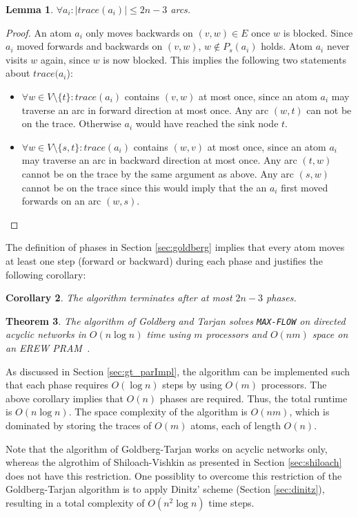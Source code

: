 \documentclass[a4paper,10pt, twocolumn]{article}
\newtheorem{lemma}{Lemma}
\newtheorem{corollary}[lemma]{Corollary}
\newtheorem{theorem}[lemma]{Theorem}
\begin{document}
\begin{lemma}
$\forall a_i:\lvert trace(a_i) \rvert \leq 2n-3$ arcs.
\end{lemma}
\begin{proof}
An atom $a_i$ only moves backwards on $(v,w) \in E$ once $w$ is blocked. Since $a_i$ moved forwards and backwards on $(v,w)$, $w \notin P_s(a_i)$ holds. Atom $a_i$ never visits $w$ again, since $w$ is now blocked. This implies the following two statements about $trace(a_i$):
\begin{itemize}
	\item $\forall w \in V \setminus \{t\}: trace(a_i)$ contains $(v,w)$ at most once, since an atom $a_i$ may traverse an arc in forward direction at most once. Any arc $(w,t)$ can not be on the trace. Otherwise $a_i$ would have reached the sink node $t$.
	\item $\forall w \in V \setminus \{s,t\}: trace(a_i)$ contains $(w,v)$ at most once, since an atom $a_i$ may traverse an arc in backward direction at most once. Any arc $(t,w)$ cannot be on the trace by the same argument as above.  Any arc $(s,w)$ cannot be on the trace since this would imply that the an $a_i$ first moved forwards on an arc $(w,s)$.
\end{itemize}
\end{proof}

The definition of phases in Section \ref{sec:goldberg} implies that every atom moves at least one step (forward or backward) during each phase and justifies the following corollary:
\begin{corollary}
The algorithm terminates after at most $2n-3$ phases.
\end{corollary}

\begin{theorem}
The algorithm of Goldberg and Tarjan solves \lstinline|MAX-FLOW| on directed acyclic networks in $O(n \log n)$ time using $m$ processors and $O(nm)$ space on an EREW PRAM~\cite{goldberg89}.
\end{theorem}

As discussed in Section \ref{sec:gt_parImpl}, the algorithm can be implemented such that each phase requires $O(\log n)$ steps by using $O(m)$ processors. The above corollary implies that $O(n)$ phases are required. Thus, the total runtime is $O(n\log n)$. The space complexity of the algorithm is $O(nm)$, which is dominated by storing the traces of $O(m)$ atoms, each of length $O(n)$.  

Note that the algorithm of Goldberg-Tarjan works on acyclic networks only, whereas the algrothim of Shiloach-Vishkin as presented in Section \ref{sec:shiloach} does not have this restriction. One possiblity to overcome this restriction of the Goldberg-Tarjan algorithm is to apply Dinitz' scheme (Section \ref{sec:dinitz}), resulting in a total complexity of $O(n^{2}\log n)$ time steps.
\end{document}
